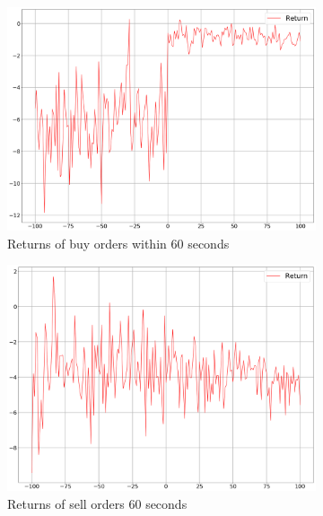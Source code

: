 \begin{figure}
\begin{subfigure}[b]{0.45\textwidth}
        \includegraphics[width=\textwidth]{images/behaviour-up-60s-buy.png}
        \caption{Returns of buy orders within 60 seconds}
        \label{fig:behvaiour-up-60s-buy}
    \end{subfigure}
    \begin{subfigure}[b]{0.45\textwidth}
        \includegraphics[width=\textwidth]{images/behaviour-up-60s-sell.png}
        \caption{Returns of sell orders 60 seconds}
        \label{fig:behvaiour-up-60s-sell}
    \end{subfigure}
    \begin{subfigure}[b]{0.45\textwidth}

\end{subfigure}
\end{figure}
